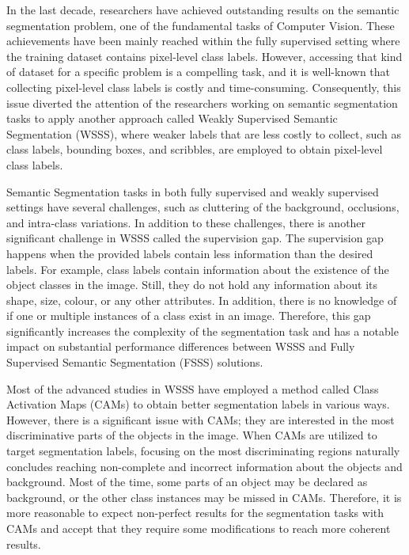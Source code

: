 \documentclass[sn-mathphys]{sn-jnl}
\theoremstyle{thmstyleone}
\theoremstyle{thmstyletwo}\newtheorem{example}{Example}\newtheorem{remark}{Remark}
\theoremstyle{thmstylethree}\newtheorem{definition}{Definition}
\begin{document}
In the last decade, researchers have achieved outstanding results on the semantic segmentation problem, one of the fundamental tasks of Computer Vision. These achievements have been mainly reached within the fully supervised setting where the training dataset contains pixel-level class labels. However, accessing that kind of dataset for a specific problem is a compelling task, and it is well-known that collecting pixel-level class labels is costly and time-consuming. Consequently, this issue diverted the attention of the researchers working on semantic segmentation tasks to apply another approach called Weakly Supervised Semantic Segmentation (WSSS), where weaker labels that are less costly to collect, such as class labels, bounding boxes, and scribbles, are employed to obtain pixel-level class labels.

Semantic Segmentation tasks in both fully supervised and weakly supervised settings have several challenges, such as cluttering of the background, occlusions, and intra-class variations. In addition to these challenges, there is another significant challenge in WSSS called the supervision gap. The supervision gap happens when the provided labels contain less information than the desired labels. For example, class labels contain information about the existence of the object classes in the image. Still, they do not hold any information about its shape, size, colour, or any other attributes. In addition, there is no knowledge of if one or multiple instances of a class exist in an image. Therefore, this gap significantly increases the complexity of the segmentation task and has a notable impact on substantial performance differences between WSSS and Fully Supervised Semantic Segmentation (FSSS) solutions.  

Most of the advanced studies in WSSS have employed a method called Class Activation Maps (CAMs) to obtain better segmentation labels in various ways. However, there is a significant issue with CAMs; they are interested in the most discriminative parts of the objects in the image. When CAMs are utilized to target segmentation labels, focusing on the most discriminating regions naturally concludes reaching non-complete and incorrect information about the objects and background. Most of the time, some parts of an object may be declared as background, or the other class instances may be missed in CAMs. Therefore, it is more reasonable to expect non-perfect results for the segmentation tasks with CAMs and accept that they require some modifications to reach more coherent results. 
\end{document}
